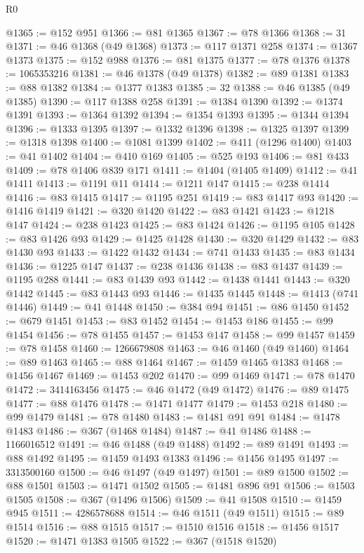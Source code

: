 \begin{lexlean}{R0}
\begin{coremodule}
@1365 := @152 @951
@1366 := @81 @1365
@1367 := @78 @1366
@1368 := 31
@1371 := @46 @1368 (@49 @1368)
@1373 := @117 @1371 @258
@1374 := @1367 @1373
@1375 := @152 @988
@1376 := @81 @1375
@1377 := @78 @1376
@1378 := 1065353216
@1381 := @46 @1378 (@49 @1378)
@1382 := @89 @1381
@1383 := @88 @1382
@1384 := @1377 @1383
@1385 := 32
@1388 := @46 @1385 (@49 @1385)
@1390 := @117 @1388 @258
@1391 := @1384 @1390
@1392 := @1374 @1391
@1393 := @1364 @1392
@1394 := @1354 @1393
@1395 := @1344 @1394
@1396 := @1333 @1395
@1397 := @1332 @1396
@1398 := @1325 @1397
@1399 := @1318 @1398
@1400 := @1081 @1399
@1402 := @411 (@1296 @1400)
@1403 := @41 @1402
@1404 := @410 @169
@1405 := @525 @193
@1406 := @81 @433
@1409 := @78 @1406 @839 @171
@1411 := @1404 (@1405 @1409)
@1412 := @41 @1411
@1413 := @1191 @11
@1414 := @1211 @147
@1415 := @238 @1414
@1416 := @83 @1415
@1417 := @1195 @251
@1419 := @83 @1417 @93
@1420 := @1416 @1419
@1421 := @320 @1420
@1422 := @83 @1421
@1423 := @1218 @147
@1424 := @238 @1423
@1425 := @83 @1424
@1426 := @1195 @105
@1428 := @83 @1426 @93
@1429 := @1425 @1428
@1430 := @320 @1429
@1432 := @83 @1430 @93
@1433 := @1422 @1432
@1434 := @741 @1433
@1435 := @83 @1434
@1436 := @1225 @147
@1437 := @238 @1436
@1438 := @83 @1437
@1439 := @1195 @288
@1441 := @83 @1439 @93
@1442 := @1438 @1441
@1443 := @320 @1442
@1445 := @83 @1443 @93
@1446 := @1435 @1445
@1448 := @1413 (@741 @1446)
@1449 := @41 @1448
@1450 := @384 @94
@1451 := @86 @1450
@1452 := @679 @1451
@1453 := @83 @1452
@1454 := @1453 @186
@1455 := @99 @1454
@1456 := @78 @1455
@1457 := @1453 @147
@1458 := @99 @1457
@1459 := @78 @1458
@1460 := 1266679808
@1463 := @46 @1460 (@49 @1460)
@1464 := @89 @1463
@1465 := @88 @1464
@1467 := @1459 @1465 @1383
@1468 := @1456 @1467
@1469 := @1453 @202
@1470 := @99 @1469
@1471 := @78 @1470
@1472 := 3414163456
@1475 := @46 @1472 (@49 @1472)
@1476 := @89 @1475
@1477 := @88 @1476
@1478 := @1471 @1477
@1479 := @1453 @218
@1480 := @99 @1479
@1481 := @78 @1480
@1483 := @1481 @91 @91
@1484 := @1478 @1483
@1486 := @367 (@1468 @1484)
@1487 := @41 @1486
@1488 := 1166016512
@1491 := @46 @1488 (@49 @1488)
@1492 := @89 @1491
@1493 := @88 @1492
@1495 := @1459 @1493 @1383
@1496 := @1456 @1495
@1497 := 3313500160
@1500 := @46 @1497 (@49 @1497)
@1501 := @89 @1500
@1502 := @88 @1501
@1503 := @1471 @1502
@1505 := @1481 @896 @91
@1506 := @1503 @1505
@1508 := @367 (@1496 @1506)
@1509 := @41 @1508
@1510 := @1459 @945
@1511 := 4286578688
@1514 := @46 @1511 (@49 @1511)
@1515 := @89 @1514
@1516 := @88 @1515
@1517 := @1510 @1516
@1518 := @1456 @1517
@1520 := @1471 @1383 @1505
@1522 := @367 (@1518 @1520)

\end{coremodule}
\end{lexlean}
